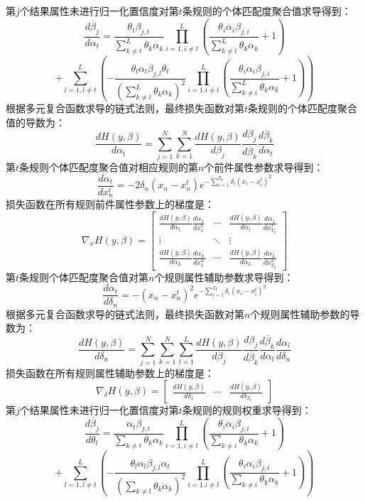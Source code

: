\documentclass{cjc}
\begin{document}
第$j$个结果属性未进行归一化置信度对第$t$条规则的个体匹配度聚合值求导得到：
$$\frac{d\overline{\beta}_j}{d\alpha_t}=\frac{\theta_t\beta_{j,t}}{\sum_{k\neq t}^L\theta_k\alpha_k}\prod_{i=1,i\neq t}^L(\frac{\theta_i\alpha_i\beta_{j,i}}{\sum_{k\neq i}^L{\theta_k\alpha_k}}+1)$$
$$+\sum_{l=1,l\neq t}^L(-\frac{\theta_l\alpha_l\beta_{j,l}\theta_t}{(\sum_{k\neq l}^L\theta_k\alpha_k)^2}\prod_{i=1.i\neq l}^L(\frac{\theta_i\alpha_i\beta_{j,i}}{\sum_{k\neq i}^L{\theta_k\alpha_k}}+1))$$
根据多元复合函数求导的链式法则，最终损失函数对第$t$条规则的个体匹配度聚合值的导数为：
$$\frac{dH(y,\beta)}{d\alpha_t}=\sum_{j=1}^N\sum_{k=1}^N\frac{dH(y,\beta)}{d\beta_j}\frac{d\beta_j}{d\overline{\beta}_k}\frac{d\overline{\beta}_k}{d\alpha_t}$$
第$t$条规则个体匹配度聚合值对相应规则的第$n$个前件属性参数求导得到：
$$\frac{d\alpha_t}{dx_n^t}=-2\delta_n(x_n-x_n^t)e^{-\sum_{i=1}^{T_k}\delta_i(x_i-x_i^t)^2}$$
损失函数在所有规则前件属性参数上的梯度是：
$$\nabla_{x}H(y,\beta)=\left[
\begin{matrix}
\frac{dH(y,\beta)}{d\alpha_1}\frac{d\alpha_1}{dx_1^1} & \cdots &
\frac{dH(y,\beta)}{d\alpha_1}\frac{d\alpha_1}{dx_{T_k}^1}\\
\vdots & \ddots & \vdots \\
\frac{dH(y,\beta)}{d\alpha_L}\frac{d\alpha_L}{dx_1^L}  & \cdots &
\frac{dH(y,\beta)}{d\alpha_L}\frac{d\alpha_L}{dx_{T_k}^L} 
\end{matrix}
\right]$$
第$t$条规则个体匹配度聚合值对第$n$个规则属性辅助参数求导得到：
$$\frac{d\alpha_t}{d\delta_n}=-(x_n-x_n^t)^{2}e^{-\sum_{i=1}^{T_k}\delta_i(x_i-x_i^t)^2}$$
根据多元复合函数求导的链式法则，最终损失函数对第$n$个规则属性辅助参数的导数为：
$$\frac{dH(y,\beta)}{d\delta_n}=\sum_{j=1}^N\sum_{k=1}^N\sum_{l=1}^L\frac{dH(y,\beta)}{d\beta_j}\frac{d\beta_j}{d\overline{\beta}_k}\frac{d\overline{\beta}_k}{d\alpha_l}\frac{d\alpha_l}{d\delta_n}$$
损失函数在所有规则属性辅助参数上的梯度是：
$$
\nabla_{\delta}H(y,\beta)=\left[
\begin{matrix}
\frac{dH(y,\beta)}{d\delta_1} & \cdots &
\frac{dH(y,\beta)}{d\delta_{T_k}}
\end{matrix}
\right]
$$
第$j$个结果属性未进行归一化置信度对第$t$条规则的规则权重求导得到：
$$\frac{d\overline{\beta}_j}{d\theta_t}=\frac{\alpha_t\beta_{j,t}}{\sum_{k\neq t}\theta_k\alpha_k}\prod_{i=1,i\neq t}^L(\frac{\theta_i\alpha_i\beta_{j,i}}{\sum_{k\neq i}{\theta_k\alpha_k}}+1)$$
$$+\sum_{l=1,l\neq t}^L(-\frac{\theta_l\alpha_l\beta_{j,l}\alpha_t}{(\sum_{k\neq l}\theta_k\alpha_k)^2}\prod_{i=1.i\neq l}^L(\frac{\theta_i\alpha_i\beta_{j,i}}{\sum_{k\neq i}{\theta_k\alpha_k}}+1))$$
\end{document}
